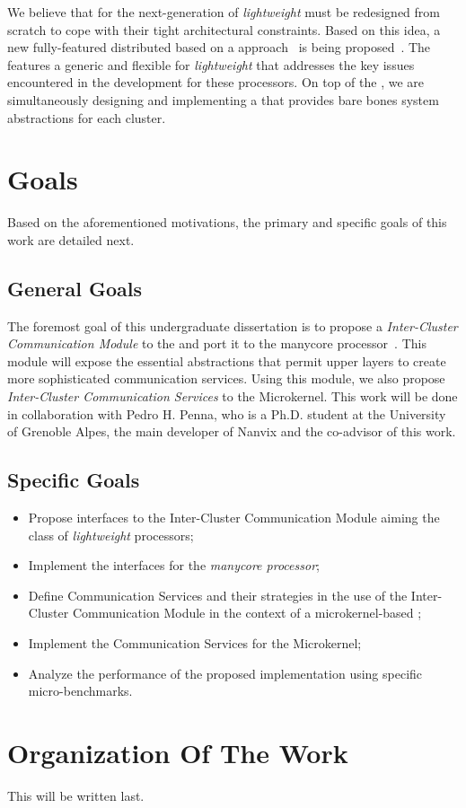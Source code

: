 	We believe that \oses for the next-generation of \textit{lightweight} \manycores must be
	redesigned from scratch to cope with their tight architectural constraints.
	Based on this idea, a new fully-featured distributed \os based on a \multikernel approach~\cite{Baumann2009}
	is being proposed~\cite{penna2017-1,penna2017-2,penna2019}.
	The \nanvix \multikernel features a generic and flexible \hal for \textit{lightweight} \manycores that
	addresses the key issues encountered in the development for these processors.
	On top of the \nanvix \hal, we are simultaneously designing and implementing a \microkernel
	that provides bare bones system abstractions for each cluster.

\section{Goals}
\label{sec.goals}

	Based on the aforementioned motivations, the primary and specific goals of this work are detailed next.

\subsection{General Goals}
\label{sec.goals.general}

	The foremost goal of this undergraduate dissertation is to propose a \textit{Inter-Cluster Communication Module}
	to the \nanvix \hal and port it to the \mppa manycore processor~\cite{DeDinechin2013-1}.
	This module will expose the essential abstractions that permit upper layers to create more
	sophisticated communication services.
	Using this module, we also propose \textit{Inter-Cluster Communication Services} to the \nanvix Microkernel.
	This work will be done in collaboration with Pedro H. Penna, who is a Ph.D. student at the
	University of Grenoble Alpes, the main developer of Nanvix and the co-advisor of this work.

\subsection{Specific Goals}
\label{sec.goals.specific}

	\begin{itemize}
		\item Propose interfaces to the Inter-Cluster Communication Module aiming
			the class of \textit{lightweight} \manycore processors;
		\item Implement the interfaces for the \textit{\mppa manycore processor};
		\item Define Communication Services and their strategies in the use of the Inter-Cluster
			Communication Module in the context of a microkernel-based \os;
		\item Implement the Communication Services for the \nanvix Microkernel;
		\item Analyze the performance of the proposed implementation using specific micro-benchmarks.
	\end{itemize}

\section{Organization Of The Work}
\label{sec.organization}

	This will be written last.